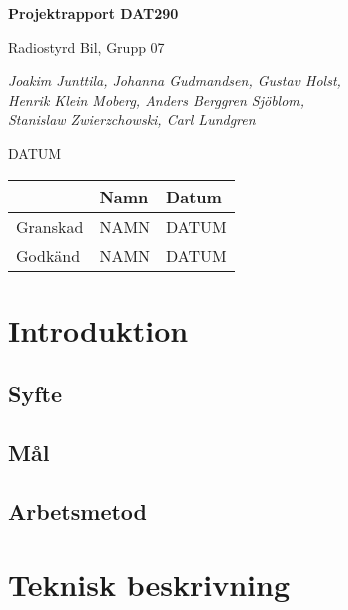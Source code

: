 \documentclass[a4paper]{article}
\begin{document}
\begin{titlepage}
\centering
{\bfseries\huge Projektrapport DAT290}

\vspace{10mm}

{\Large Radiostyrd Bil, Grupp 07}

\vspace{20mm}

{\Large \itshape{Joakim Junttila, Johanna Gudmandsen, Gustav Holst,\\Henrik Klein Moberg, Anders Berggren Sjöblom, \\[1mm] Stanislaw Zwierzchowski, Carl Lundgren}}

\vspace{10mm}

{DATUM}


\normalsize{
\begin{table}[b]
\centering
\begin{tabular}{|l|l|l|}  \hline
          & \bf Namn & \bf Datum   \\ \hline \hline
 Granskad & NAMN     & DATUM        \\ \hline
 Godkänd  & NAMN     & DATUM         \\ \hline
  \end{tabular}  
  \end{table}}
\end{titlepage}

\tableofcontents


\newpage
\section{Introduktion}

\subsection{Syfte}


\subsection{Mål}


\subsection{Arbetsmetod}





\section{Teknisk beskrivning}
\end{document}
